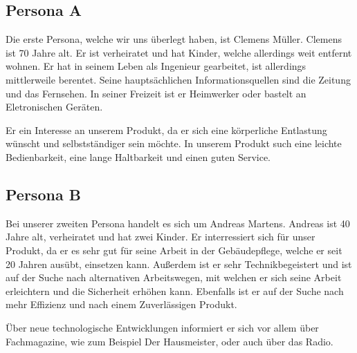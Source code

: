 \subsection{Persona A} 
    Die erste Persona, welche wir uns überlegt haben, ist Clemens Müller. Clemens ist 70 Jahre alt. Er ist verheiratet 
    und hat Kinder, welche allerdings weit entfernt wohnen. Er hat in seinem Leben als Ingenieur gearbeitet, ist 
    allerdings mittlerweile berentet. Seine hauptsächlichen Informationsquellen sind die Zeitung und das Fernsehen. In 
    seiner Freizeit ist er Heimwerker oder bastelt an Eletronischen Geräten. 

    Er ein Interesse an unserem Produkt, da er sich eine körperliche Entlastung wünscht und selbstständiger sein möchte.
    In unserem Produkt such eine leichte Bedienbarkeit, eine lange Haltbarkeit und einen guten Service.

\subsection{Persona B} 
    Bei unserer zweiten Persona handelt es sich um Andreas Martens. Andreas ist 40 Jahre alt, verheiratet und hat zwei 
    Kinder. Er interressiert sich für unser Produkt, da er es sehr gut für seine Arbeit in der Gebäudepflege, welche er 
    seit 20 Jahren ausübt, einsetzen kann. Außerdem ist er sehr Technikbegeistert und ist auf der Suche nach 
    alternativen Arbeitswegen, mit welchen er sich seine Arbeit erleichtern und die Sicherheit erhöhen kann. Ebenfalls 
    ist er auf der Suche nach mehr Effizienz und nach einem Zuverlässigen Produkt.

    Über neue technologische Entwicklungen informiert er sich vor allem über Fachmagazine, wie zum Beispiel \as Der
    Hausmeister\adl, oder auch über das Radio.